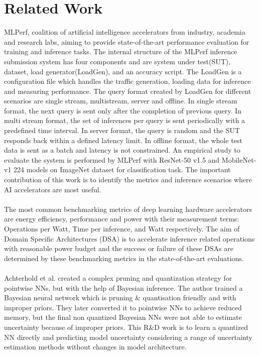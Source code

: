\documentclass[rnd]{mas_proposal}
\begin{document}
\section{Related Work}
MLPerf\cite{reddi2019mlperf}, coalition of artificial intelligence accelerators from industry, academia and research labs, aiming to provide state-of-the-art performance evaluation for training and inference tasks. The internal structure of the MLPerf inference submission system has four components and are system under test(SUT), dataset, load generator(LoadGen), and an accuracy script. The LoadGen is a configuration file which handles the traffic generation, loading data for inference  and measuring performance. The query format created by LoadGen for different scenarios are single stream, multistream, server and offline. In single stream format, the next query is sent only after the completion of previous query. In multi stream format, the set of inferences per query is sent periodically with a  predefined time interval. In server format, the query is random and the SUT responds back within a defined latency limit. In offline format, the whole test data is sent as a batch and latency is not constrained. An empirical study to evaluate the system is performed by MLPerf with ResNet-50 v1.5 and MobileNet-v1 224 models on ImageNet dataset for classification task. The important contribution of this work is to identify the metrics and inference scenarios where AI accelerators are most useful.
\\\\
The most common benchmarking metrics of deep learning hardware accelerators are energy efficiency, performance and power\cite{libutti2020benchmarking} with their measurement terms: Operations per Watt, Time per inference, and Watt respectively. The aim of Domain Specific Architectures (DSA) is to accelerate inference related operations with reasonable power budget and the success or failure of these DSAs are determined by these benchmarking metrics in the state-of-the-art evaluations. 
\\\\
Achterhold et al. created a complex pruning and quantization strategy for pointwise NNs, but with the help of Bayesian inference\cite{achterhold2018variational}. The author trained a Bayesian neural network which is pruning \& quantisation friendly and with improper priors. They later converted it to pointwise NNs to achieve reduced memory, but the final non quantized Bayesian NNs were not able to estimate uncertainty because of improper priors\cite{ferianc2021effects}. This R\&D work is to learn a quantized NN directly and predicting model uncertainty considering a range of uncertainty estimation methods without changes in model architecture.
\end{document}
